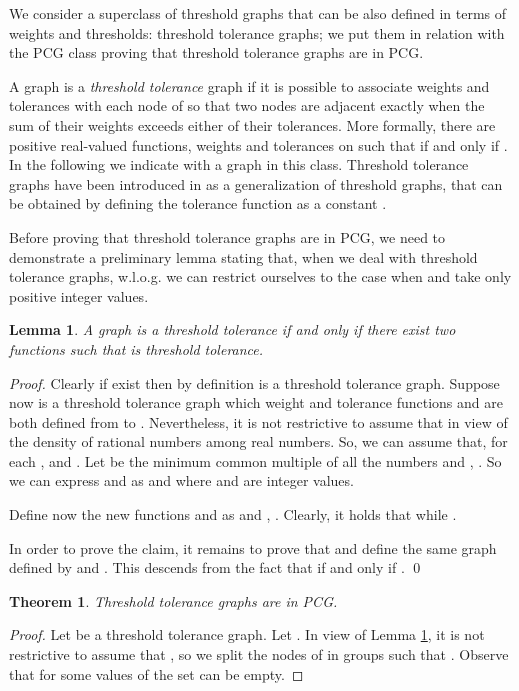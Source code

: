 \documentclass{elsarticle}
\newtheorem{theorem}{Theorem}
\newtheorem{lemma}{Lemma}
\begin{document}
\begin{doublespace}
We consider a superclass of threshold graphs that can be also defined in terms of weights and thresholds: threshold tolerance graphs; we put them in relation with the PCG class proving that threshold tolerance graphs are in PCG.

A graph  is a \emph{threshold tolerance} graph if it is possible to associate weights and tolerances with each node of  so that two nodes are adjacent exactly when the sum of their weights exceeds either of their tolerances.
More formally, there are positive real-valued functions, weights  and tolerances  on  such that   if and only if .
In the following we  indicate with  a graph in this class.
Threshold tolerance graphs have been introduced in \cite{MRT86} as a generalization of threshold graphs, that can be obtained by defining the tolerance function as a constant \cite{MRT88}. 

Before proving that threshold tolerance graphs are in PCG, we need to demonstrate a preliminary lemma stating that, when we deal with threshold tolerance graphs, w.l.o.g. we can restrict ourselves to the case when  and  take only positive integer values.

\begin{lemma}
\label{lemma.int}
A graph  is a threshold tolerance if and only if there exist two functions  such that  is threshold tolerance.
\end{lemma}

\begin{proof}
Clearly if  exist then by definition  is a threshold tolerance graph. Suppose now  is a threshold tolerance graph which weight and tolerance functions  and  are both defined from  to . 
Nevertheless, it is not restrictive to assume that  in view of the density of rational numbers among real numbers.
So, we can assume that, for each ,  and .
Let  be the minimum common multiple of all the numbers  and , . 
So we can express  and  as  and 
 where  and  are integer values.

Define now the new functions  and  as  and , .
Clearly, it holds that  while .

In order to prove the claim, it remains to prove that  and  define the same graph defined by  and .
This descends from the fact that  if and only if . \qed
\end{proof}


\begin{theorem}
\label{th.TTinmLPG}
Threshold tolerance graphs are in PCG.
\end{theorem}
\begin{proof}
Let  be a threshold tolerance graph. 
Let .
In view of Lemma \ref{lemma.int}, it is not restrictive to assume that , so we split the nodes of   in groups  such that . Observe that for some values of  the set   can be empty.  


\end{proof}
\end{doublespace}
\end{document}
